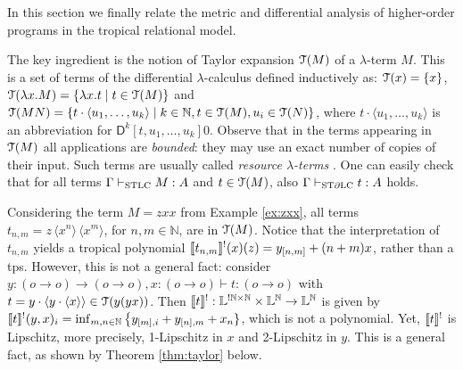
In this section we finally relate the metric and differential analysis of higher-order programs in the tropical relational model. 

The key ingredient is the notion of Taylor expansion $\mathcal{T}(M)$ of a $\lambda$-term $M$. This is a set of terms of the differential $\lambda$-calculus defined inductively as: 
%
%
%
%
%
%
%
$\mathcal{T}(x)=\{x\}$, $\mathcal{T}(\lambda x.M)=\{\lambda x.t\mid t\in \mathcal{T}(M)\}$ and 
$\mathcal{T}(MN)=\{t\cdot \langle u_{1},\dots, u_{k}\rangle  \mid k\in \mathbb N, t\in \mathcal{T}(M), u_{i}\in \mathcal{T}(N) \}$, where $t\cdot \langle u_{1},\dots, u_{k}\rangle$ is an abbreviation for $\mathsf D^{k}[t, u_{1},\dots, u_{k}] 0$. 
Observe that in the terms appearing in $\mathcal{T}(M)$ all applications are \emph{bounded}: they may use an exact number of copies of their input. 
Such terms are usually called \emph{resource $\lambda$-terms} \cite{Pagani2009, Manzo2012}. One can easily check that for all terms $\Gamma \vdash_{\mathrm{STLC}}M:A$ and  $t\in \mathcal{T}(M)$, also 
$\Gamma \vdash_{\mathrm{ST}\partial\mathrm{LC}}t:A$ holds. 
\begin{example}
Considering the term $M=zxx$ from Example \ref{ex:zxx}, all terms
 $t_{n,m}=z \,\langle x^{n}\rangle\,\langle x^{m}\rangle$, for $n,m\in \mathbb N$, are in $\mathcal{T}(M)$. 
Notice that the interpretation of $t_{n,m}$ yields a tropical polynomial
$\llbracket t_{n,m}\rrbracket^{!}(x)(z)= y_{[n,m]}+(n+m)x$, rather than a tps. 
However, this is not a general fact: consider $y:(o\to o )\to (o\to o), x:(o\to o) \vdash t:  (o\to  o)$
with $t=y\cdot \langle y\cdot \langle x\rangle \rangle\in \mathcal{T}(y(yx))$. Then 
$\llbracket t\rrbracket^{!}: \mathbb{L}^{  !\mathbb N\times \mathbb N}
\times \mathbb{L}^{\mathbb N} \to \mathbb{L}^{\mathbb N}$ is given by
$
\llbracket t\rrbracket^{!}(y,x)_{i}= \inf_{m,n\in \mathbb N}\big\{    y_{[m],i}  +  y_{[n],m}+  x_{n}\}
$, 
which is not a polynomial. Yet, $\llbracket t\rrbracket^{!}$ is Lipschitz, more precisely, 1-Lipschitz in $x$ and 2-Lipschitz in $y$. This is a general fact, as shown by Theorem \ref{thm:taylor} below.
\end{example}

